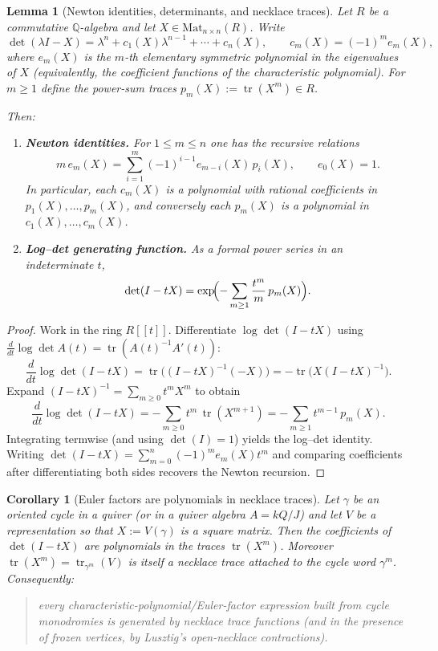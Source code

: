 \documentclass[11pt,oneside]{amsbook}
\numberwithin{equation}{section}
\theoremstyle{plain}
\newtheorem{lemma}[theorem]{Lemma}
\newtheorem{corollary}[theorem]{Corollary}
\theoremstyle{definition}
\theoremstyle{remark}
\DeclareMathOperator{\tr}{tr}
\newcommand{\Q}{\mathbb{Q}}
\providecommand{\Mat}{\mathrm{Mat}}
\begin{document}
\begin{lemma}[Newton identities, determinants, and necklace traces]
\label{lem:newton_necklace}
Let $R$ be a commutative $\Q$-algebra and let $X\in \Mat_{n\times n}(R)$.
Write
\[
\det(\lambda I - X)=\lambda^n + c_1(X)\lambda^{n-1}+\cdots + c_n(X),
\qquad c_m(X)=(-1)^m e_m(X),
\]
where $e_m(X)$ is the $m$-th elementary symmetric polynomial in the eigenvalues of $X$ (equivalently, the coefficient functions of the characteristic polynomial).
For $m\ge 1$ define the \emph{power-sum traces} $p_m(X):=\tr(X^m)\in R$.

Then:
\begin{enumerate}[label=(\roman*)]
\item \textbf{Newton identities.} For $1\le m\le n$ one has the recursive relations
\[
m\,e_m(X)=\sum_{i=1}^{m}(-1)^{i-1}e_{m-i}(X)\,p_i(X),
\qquad e_0(X)=1.
\]
In particular, each $c_m(X)$ is a polynomial with rational coefficients in $p_1(X),\dots,p_m(X)$, and conversely each $p_m(X)$ is a polynomial in $c_1(X),\dots,c_m(X)$.
\item \textbf{Log--det generating function.} As a formal power series in an indeterminate $t$,
\[
\det(I-tX)=\exp\!\Bigl(-\sum_{m\ge 1}\frac{t^m}{m}\,p_m(X)\Bigr).
\]
\end{enumerate}
\end{lemma}

\begin{proof}
Work in the ring $R[[t]]$.
Differentiate $\log\det(I-tX)$ using $\frac{d}{dt}\log\det A(t)=\tr(A(t)^{-1}A'(t))$:
\[
\frac{d}{dt}\log\det(I-tX)
=\tr\!\bigl((I-tX)^{-1}(-X)\bigr)
=-\tr\!\bigl(X(I-tX)^{-1}\bigr).
\]
Expand $(I-tX)^{-1}=\sum_{m\ge 0} t^m X^m$ to obtain
\[
\frac{d}{dt}\log\det(I-tX)=-\sum_{m\ge 0} t^m\,\tr(X^{m+1})
=-\sum_{m\ge 1} t^{m-1}\,p_m(X).
\]
Integrating termwise (and using $\det(I)=1$) yields the log--det identity.
Writing $\det(I-tX)=\sum_{m=0}^n (-1)^m e_m(X)t^m$ and comparing coefficients after differentiating both sides recovers the Newton recursion.
\end{proof}

\begin{corollary}[Euler factors are polynomials in necklace traces]
\label{cor:euler_factors_necklaces}
Let $\gamma$ be an oriented cycle in a quiver (or in a quiver algebra $A=kQ/J$) and let $V$ be a representation so that $X:=V(\gamma)$ is a square matrix.
Then the coefficients of $\det(I-tX)$ are polynomials in the traces $\tr(X^m)$.
Moreover $\tr(X^m)=\tr_{\gamma^m}(V)$ is itself a \emph{necklace trace} attached to the cycle word $\gamma^m$.
Consequently:
\begin{quote}
\emph{every characteristic-polynomial/Euler-factor expression built from cycle monodromies is generated by necklace trace functions (and in the presence of frozen vertices, by Lusztig's open-necklace contractions).}
\end{quote}
\end{corollary}
\end{document}
